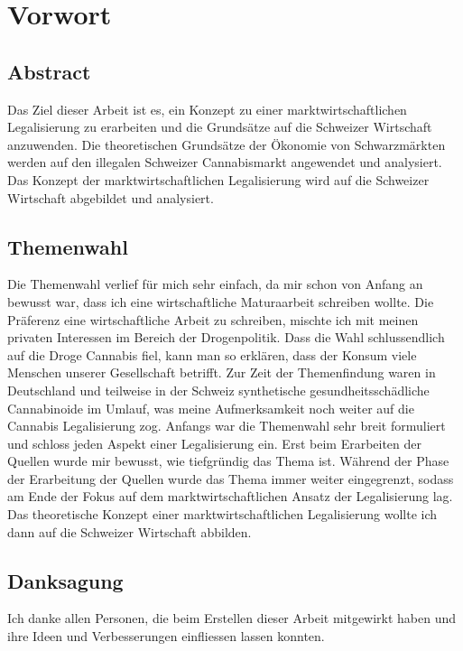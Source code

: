 \documentclass[../main.tex]{subfiles}
\begin{document}
	\section{Vorwort}
	
	\subsection{Abstract}
	Das Ziel dieser Arbeit ist es, ein Konzept zu einer marktwirtschaftlichen Legalisierung zu erarbeiten und die Grundsätze auf die Schweizer Wirtschaft anzuwenden. 
	Die theoretischen Grundsätze der Ökonomie von Schwarzmärkten werden auf den illegalen Schweizer Cannabismarkt angewendet und analysiert.
	Das Konzept der marktwirtschaftlichen Legalisierung wird auf die Schweizer Wirtschaft abgebildet und analysiert.
	
	
	
	\subsection{Themenwahl}
	Die Themenwahl verlief für mich sehr einfach, da mir schon von Anfang an bewusst war, dass ich eine wirtschaftliche Maturaarbeit schreiben wollte. 
	Die Präferenz eine wirtschaftliche Arbeit zu schreiben, mischte ich mit meinen privaten Interessen im Bereich der Drogenpolitik. 
	Dass die Wahl schlussendlich auf die Droge Cannabis fiel, kann man so erklären, dass der Konsum viele Menschen unserer Gesellschaft betrifft. 
	Zur Zeit der Themenfindung waren in Deutschland und teilweise in der Schweiz synthetische gesundheitsschädliche Cannabinoide im Umlauf, was meine Aufmerksamkeit noch weiter auf die Cannabis Legalisierung zog. 
	Anfangs war die Themenwahl sehr breit formuliert und schloss jeden Aspekt einer Legalisierung ein. 
	Erst beim Erarbeiten der Quellen wurde mir bewusst, wie tiefgründig das Thema ist.	
	Während der Phase der Erarbeitung der Quellen wurde das Thema immer weiter eingegrenzt, sodass am Ende der Fokus auf dem marktwirtschaftlichen Ansatz der Legalisierung lag.
	Das theoretische Konzept einer marktwirtschaftlichen Legalisierung wollte ich dann auf die Schweizer Wirtschaft abbilden.
	
	
	\subsection{Danksagung}
	Ich danke allen Personen, die beim Erstellen dieser Arbeit mitgewirkt haben und ihre Ideen und Verbesserungen einfliessen lassen konnten.
	
\end{document}
